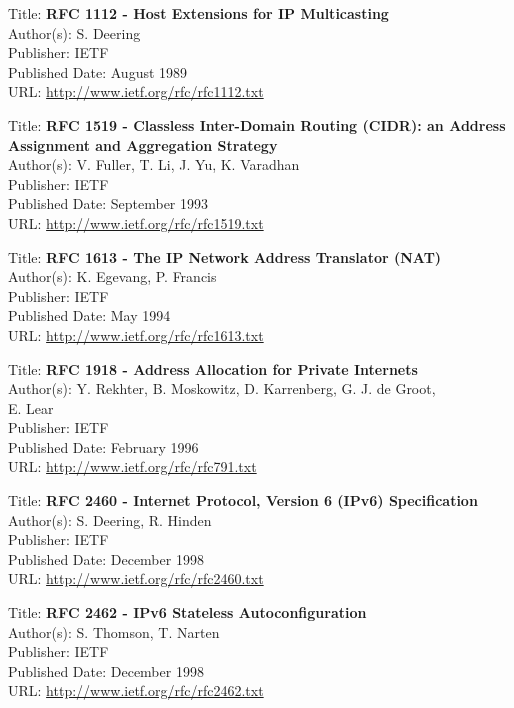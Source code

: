 Title: \textbf{RFC 1112 - Host Extensions for IP Multicasting} \\
Author(s): S. Deering \\
Publisher: IETF \\ 
Published Date: August 1989 \\
URL: \url{http://www.ietf.org/rfc/rfc1112.txt}   


Title: \textbf{RFC 1519 - Classless Inter-Domain Routing (CIDR): an Address} \\
\hspace{15mm} \textbf{Assignment and Aggregation Strategy} \\
Author(s): V. Fuller, T. Li, J. Yu, K. Varadhan \\
Publisher: IETF \\ 
Published Date: September 1993  \\
URL: \url{http://www.ietf.org/rfc/rfc1519.txt}   


Title: \textbf{RFC 1613 - The IP Network Address Translator (NAT)} \\
Author(s): K. Egevang, P. Francis \\
Publisher: IETF \\ 
Published Date: May 1994  \\
URL: \url{http://www.ietf.org/rfc/rfc1613.txt}   


Title: \textbf{RFC 1918 - Address Allocation for Private Internets} \\
Author(s): Y. Rekhter, B. Moskowitz, D. Karrenberg, G. J. de Groot, \\
\hspace{15mm} E. Lear \\ 
Publisher: IETF \\ 
Published Date: February 1996  \\
URL: \url{http://www.ietf.org/rfc/rfc791.txt}    


Title: \textbf{RFC 2460 - Internet Protocol, Version 6 (IPv6) Specification} \\
Author(s): S. Deering, R. Hinden \\
Publisher: IETF \\ 
Published Date: December 1998 \\ 
URL: \url{http://www.ietf.org/rfc/rfc2460.txt}   


Title: \textbf{RFC 2462 - IPv6 Stateless Autoconfiguration} \\
Author(s): S. Thomson, T. Narten \\
Publisher: IETF \\ 
Published Date: December 1998\\
URL: \url{http://www.ietf.org/rfc/rfc2462.txt}   


